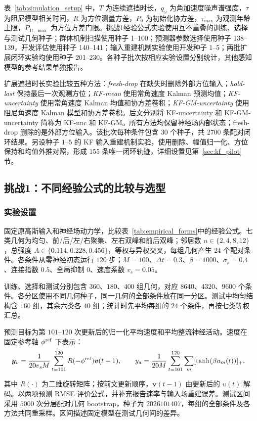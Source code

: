 \documentclass[UTF8,fontset=windows,11pt]{ctexart}
\begin{document}
表~\ref{tab:simulation_setup} 中，$T$ 为连续遮挡时长，$q_\omega$ 为角加速度噪声谱强度，$\tau$ 为阻尼模型相关时间，$R$ 为方位测量方差，$P_0$ 为初始化协方差，$\tau_{\max}$ 为观测年龄上限，$P_{11,\max}$ 为方位方差门限。挑战1经验公式实验使用互不重叠的训练、选择与测试几何种子；群体机制扫描使用种子 1--100；预测器参数选择使用种子 138--139，开发评估使用种子 140--141；输入重建机制实验使用开发种子 1--5；两批扩展闭环实验均使用种子 201--230。各种子批次按相应实验设置分别统计，其他感知模型的参考结果单独报告。

扩展遮挡时长实验比较五种方法：\textit{fresh-drop} 在缺失时删除外部方位输入；\textit{hold-last} 保持最后一次观测方位；\textit{KF-mean} 使用常角速度 Kalman 预测均值；\textit{KF-uncertainty} 使用常角速度 Kalman 均值和协方差卷积；\textit{KF-GM-uncertainty} 使用阻尼角速度 Kalman 模型和协方差卷积。后文分别将 KF-uncertainty 和 KF-GM-uncertainty 简称为 KF-unc 和 KF-GM。所有方法均保留神经场内部状态；fresh-drop 删除的是外部方位输入。该批次每种条件包含 30 个种子，共 2700 条配对闭环结果。另设种子 $1$--$5$ 的 KF 输入重建机制实验，使用删除、幅值归一化、方位保持和均值外推对照，形成 $155$ 条唯一闭环轨迹，详细设置见第~\ref{sec:kf_pilot} 节。


\subsection{挑战1：不同经验公式的比较与选型}
\label{sec:challenge1_results}
\subsubsection{实验设置}
固定原高斯输入和神经场动力学，比较表~\ref{tab:empirical_forms}中的经验公式。七类几何为均匀、前/后/左/右聚集、左右双峰和前后双峰；邻居数 $n\in\{2,4,8,12\}$，总强度 $A\in\{0.114,0.228,0.456\}$，等权与异权交叉，每组几何产生 $24$ 个配对条件。各条件从零神经初态运行 $120$ 步；$M=100$、$\Delta t=0.3$、$\beta=1000$、$\sigma_s=0.4$、连接指数 $0.5$、全局抑制 $0$、速度系数 $v_s=0.05$。

训练、选择和测试分别包含 $360$、$180$、$400$ 组几何，对应 $8640$、$4320$、$9600$ 个条件。各分区使用不同几何种子，同一几何的全部条件放在同一分区。测试中均匀结构含 $160$ 组，其余六类各 $40$ 组；统计时先平均每组的 $24$ 个条件，再按七类等权汇总。

\begin{samepage}
预测目标为第 $101$--$120$ 次更新后的归一化平均速度和平均整流神经活动。速度在固定参考轴 $\phi^{\rm ref}$ 下表示：
\begin{equation}
 \boldsymbol y_v=\frac1{20v_sM}\sum_{t=101}^{120}R(-\phi^{\rm ref})\boldsymbol v(t-1),\qquad
 y_a=\frac1{20M}\sum_{t=101}^{120}\sum_m[\tanh(\beta u_m(t))]_+,
\end{equation}
\end{samepage}
其中 $R(\cdot)$ 为二维旋转矩阵；按前文更新顺序，$\boldsymbol v(t-1)$ 由更新后的 $u(t)$ 解码。以两项预测 RMSE 评价公式，并补充报告速率与输入场重建误差。测试区间采用 $5000$ 次分层配对几何 bootstrap，种子为 $2026101407$，每组的全部条件及各方法共同重采样。区间描述固定模型在测试几何间的差异。
\end{document}
